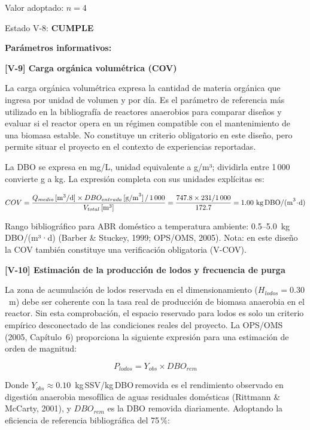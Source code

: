 \documentclass[12pt,a4paper]{article}
\begin{document}
Valor adoptado: $n = 4$

Estado V-8: \textbf{CUMPLE}

\textbf{Parámetros informativos:}

\textbf{[V-9] Carga orgánica volumétrica (COV)}

La carga orgánica volumétrica expresa la cantidad de materia orgánica que ingresa por unidad de volumen y por día. Es el parámetro de referencia más utilizado en la bibliografía de reactores anaerobios para comparar diseños y evaluar si el reactor opera en un régimen compatible con el mantenimiento de una biomasa estable. No constituye un criterio obligatorio en este diseño, pero permite situar el proyecto en el contexto de experiencias reportadas.

La DBO se expresa en mg/L, unidad equivalente a g/m³; dividirla entre 1\,000 convierte g a kg. La expresión completa con sus unidades explícitas es:

\begin{equation}
COV = \frac{Q_{medio} \,[\text{m}^3/\text{d}] \times DBO_{entrada} \,[\text{g/m}^3] \,/\, 1\,000}{V_{total} \,[\text{m}^3]} = \frac{747.8 \times 231 / 1\,000}{172.7} = 1.00 \text{ kg\,DBO/(m}^3\!\cdot\!\text{d)}
\end{equation}

Rango bibliográfico para ABR doméstico a temperatura ambiente: 0.5--5.0~kg\,DBO/(m³·d) (Barber \& Stuckey, 1999; OPS/OMS, 2005). Nota: en este diseño la COV también constituye una verificación obligatoria (V-COV).

\textbf{[V-10] Estimación de la producción de lodos y frecuencia de purga}

La zona de acumulación de lodos reservada en el dimensionamiento ($H_{lodos} = 0.30$~m) debe ser coherente con la tasa real de producción de biomasa anaerobia en el reactor. Sin esta comprobación, el espacio reservado para lodos es solo un criterio empírico desconectado de las condiciones reales del proyecto. La OPS/OMS (2005, Capítulo~6) proporciona la siguiente expresión para una estimación de orden de magnitud:

\begin{equation}
P_{lodos} = Y_{obs} \times DBO_{rem}
\end{equation}

Donde $Y_{obs} \approx 0.10$~kg\,SSV/kg\,DBO\,removida es el rendimiento observado en digestión anaerobia mesofílica de aguas residuales domésticas (Rittmann \& McCarty, 2001), y $DBO_{rem}$ es la DBO removida diariamente. Adoptando la eficiencia de referencia bibliográfica del 75\,\%:
\end{document}
